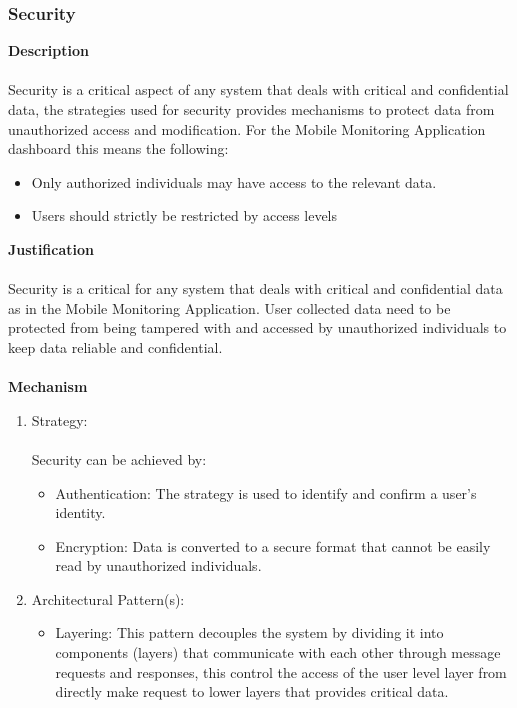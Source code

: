 \documentclass[hidelinks, 12pt, oneside]{article}
\begin{document}
			\subsubsection*{Security}
				\textbf{Description} \\\\
				Security is a critical aspect of any system that deals with critical and confidential data, the strategies used for security provides mechanisms to protect data from unauthorized access and modification. For the Mobile Monitoring Application dashboard this means the following:
				\begin{itemize}
					\item Only authorized individuals may have access to the relevant data.
					\item Users should strictly be restricted by access levels    
				\end{itemize}
				\textbf{Justification} \\\\
				Security is a critical for any system that deals with critical and confidential data as in the Mobile Monitoring Application. User collected data need to be protected from being tampered with and accessed by unauthorized individuals to keep data reliable and confidential.\\\\
				\textbf{Mechanism}
				\begin{enumerate}
					\item Strategy: \\\\
						Security can be achieved by:
						\begin{itemize}
							\item Authentication: The strategy is used to identify and confirm a user's identity.  
							\item Encryption: Data is converted to a secure format that cannot be easily read by unauthorized individuals. 
						\end{itemize}
					\item Architectural Pattern(s):
						\begin{itemize}
							\item Layering: This pattern decouples the system by dividing it into components (layers) that communicate with each other through message requests and responses, this control the access of the user level layer from directly make request to lower layers that provides critical data. 
						\end{itemize}
				\end{enumerate}		
\end{document}
